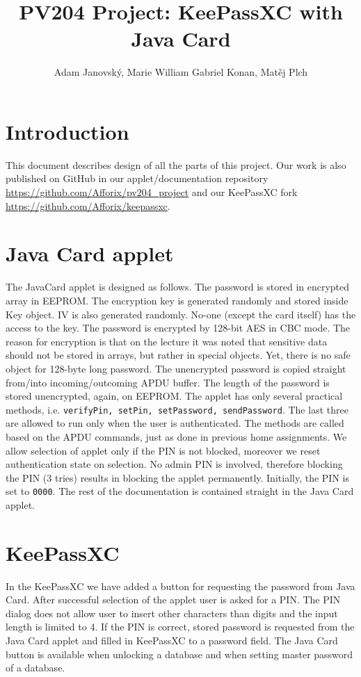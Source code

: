 \documentclass[12pt,a4paper]{article}
\title{PV204 Project: KeePassXC with Java Card}
\author{Adam Janovský, Marie William Gabriel Konan, Matěj Plch}
\date{}
\begin{document}
\maketitle

\section*{Introduction}
This document describes design of all the parts of this project. Our work is also published on GitHub in our applet/documentation repository \url{https://github.com/Afforix/pv204_project} and our KeePassXC fork \url{https://github.com/Afforix/keepassxc}.

\section*{Java Card applet}
The JavaCard applet is designed as follows. The password is stored in encrypted array in EEPROM. The encryption key is generated randomly and stored inside Key object. IV is also generated randomly. No-one (except the card itself) has the access to the key. The password is encrypted by 128-bit AES in CBC mode. The reason for encryption is that on the lecture it was noted that sensitive data should not be stored in arrays, but rather in special objects. Yet, there is no safe object for 128-byte long password. The unencrypted password is copied straight from/into incoming/outcoming APDU buffer. The length of the password is stored unencrypted, again, on EEPROM. The applet has only several practical methods, i.e. \texttt{verifyPin, setPin, setPassword, sendPassword}. The last three are allowed to run only when the user is authenticated. The methods are called based on the APDU commands, just as done in previous home assignments. We allow selection of applet only if the PIN is not blocked, moreover we reset authentication state on selection. No admin PIN is involved, therefore blocking the PIN (3 tries) results in blocking the applet permanently. Initially, the PIN is set to \texttt{0000}. The rest of the documentation is contained straight in the Java Card applet.

\section*{KeePassXC}
In the KeePassXC we have added a button for requesting the password from Java Card. After successful selection of the applet user is asked for a PIN. The PIN dialog does not allow user to insert other characters than digits and the input length is limited to 4. If the PIN is correct, stored password is requested from the Java Card applet and filled in KeePassXC to a password field. The Java Card button is available when unlocking a database and when setting master password of a database.
\end{document}
